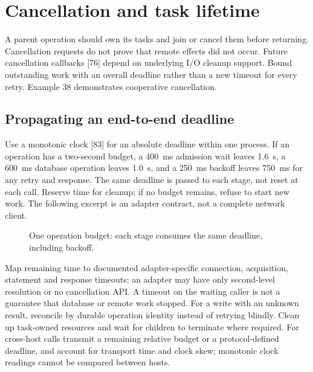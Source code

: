 \documentclass[11pt,openany]{book}
\begin{document}



\section{Cancellation and task lifetime}
A parent operation should own its tasks and join or cancel them before returning.
Cancellation requests do not prove that remote effects did not occur.
Future cancellation callbacks [76] depend on underlying I/O cleanup support.
Bound outstanding work with an overall deadline rather than a new timeout
for every retry. Example 38 demonstrates cooperative cancellation.

\subsection{Propagating an end-to-end deadline}
Use a monotonic clock [83] for an absolute deadline within one process.
If an operation has a two-second budget, a 400~ms admission wait leaves
1.6~s, a 600~ms database operation leaves 1.0~s, and a 250~ms backoff
leaves 750~ms for any retry and response. The same deadline is passed
to each stage, not reset at each call. Reserve time for cleanup; if no
budget remains, refuse to start new work. The following excerpt is an
adapter contract, not a complete network client.
\begin{figure}[H]\centering
{}
\caption{One operation budget: each stage consumes the same deadline, including backoff.}
\end{figure}
Map remaining time to documented adapter-specific connection, acquisition,
statement and response timeouts; an adapter may have only second-level
resolution or no cancellation API. A timeout on the waiting caller is not
a guarantee that database or remote work stopped. For a write with an
unknown result, reconcile by durable operation identity instead of retrying
blindly. Clean up task-owned resources and wait for children to terminate
where required. For cross-host calls transmit a remaining relative budget
or a protocol-defined deadline, and account for transport time and clock
skew; monotonic clock readings cannot be compared between hosts.
\end{document}
